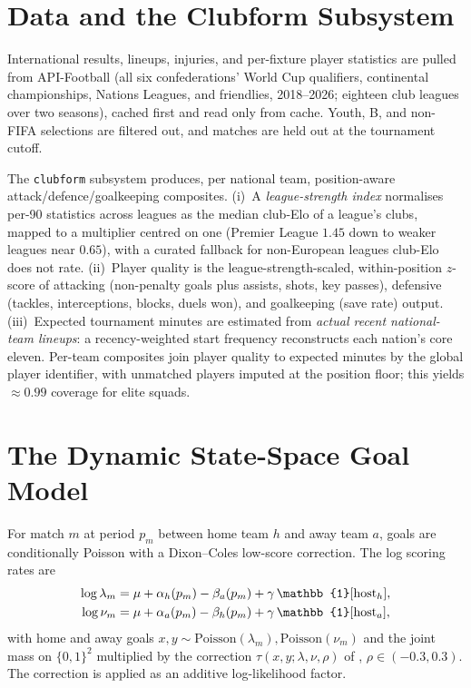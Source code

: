 \documentclass[11pt]{article}
\begin{document}
\section{Data and the Clubform Subsystem}\label{sec:data}
International results, lineups, injuries, and per-fixture player statistics are
pulled from API-Football \cite{apifootball} (all six confederations' World Cup
qualifiers, continental championships, Nations Leagues, and friendlies,
2018--2026; eighteen club leagues over two seasons), cached first and read only
from cache. Youth, B, and non-FIFA selections are filtered out, and matches are
held out at the tournament cutoff.

The \texttt{clubform} subsystem produces, per national team, position-aware
attack/defence/goalkeeping composites. (i)~A \emph{league-strength index}
normalises per-90 statistics across leagues as the median club-Elo
\cite{clubelo} of a league's clubs, mapped to a multiplier centred on one
(Premier League $1.45$ down to weaker leagues near $0.65$), with a curated
fallback for non-European leagues club-Elo does not rate. (ii)~Player quality is
the league-strength-scaled, within-position $z$-score of attacking
(non-penalty goals plus assists, shots, key passes), defensive (tackles,
interceptions, blocks, duels won), and goalkeeping (save rate) output.
(iii)~Expected tournament minutes are estimated from \emph{actual recent
national-team lineups}: a recency-weighted start frequency reconstructs each
nation's core eleven. Per-team composites join player quality to expected
minutes by the global player identifier, with unmatched players imputed at the
position floor; this yields $\approx0.99$ coverage for elite squads.

\section{The Dynamic State-Space Goal Model}\label{sec:model}
For match $m$ at period $p_m$ between home team $h$ and away team $a$, goals are
conditionally Poisson with a Dixon--Coles low-score correction. The log scoring
rates are
\begin{align}
\log\lambda_m &= \mu + \att_h(p_m) - \dfn_a(p_m) + \gamma\,\mathbb{1}[\text{host}_h],\\
\log\nu_m     &= \mu + \att_a(p_m) - \dfn_h(p_m) + \gamma\,\mathbb{1}[\text{host}_a],
\end{align}
with home and away goals $x,y \sim \mathrm{Poisson}(\lambda_m),\mathrm{Poisson}(\nu_m)$
and the joint mass on $\{0,1\}^2$ multiplied by the correction
$\tau(x,y;\lambda,\nu,\rho)$ of \cite{dixoncoles1997}, $\rho\in(-0.3,0.3)$. The
correction is applied as an additive log-likelihood factor.
\end{document}
